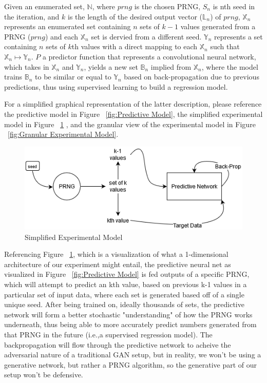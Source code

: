 \documentclass[conference]{IEEEtran}
\begin{document}
Given an enumerated set, $\mathbb{N}$,
where $prng$ is the chosen PRNG, $S_n$ is nth seed in the iteration, and $k$ is the length of the desired output vector ($\mathbb{L}_n$) of $prng$,
$\mathbb{X}_n$ represents an enumerated set containing $n$ sets of $k-1$ values generated from a PRNG ($prng$) and each $\mathbb{X}_n$ set is dervied from a different seed. $\mathbb{Y}_n$ represents a set containing $n$ sets of $k$th values with a direct mapping to each $\mathbb{X}_n$ such that $\mathbb{X}_n \mapsto \mathbb{Y}_n$. $P$ a predictor function that represents a convolutional neural network, which takes in $\mathbb{X}_n$ and $\mathbb{Y}_n$, yields a new set $\mathbb{B}_n$ implied from $\mathbb{X}_n$, where the model trains $\mathbb{B}_n$ to be similar or equal to $\mathbb{Y}_n$ based on back-propagation due to previous predictions, thus using supervised learning to build a regression model.

For a simplified graphical representation of the latter description, please reference the predictive model in Figure ~\ref{fig:Predictive Model}, the simplified experimental model in Figure ~\ref{fig:Simplified Experimental Model} , and the granular view of the experimental model in Figure ~\ref{fig:Granular Experimental Model}.


\begin{figure}[H]
\centering
\includegraphics[width=1\linewidth]{./Images/SimpleModel.png}
\caption{Simplified Experimental Model}
\label{fig:Simplified Experimental Model}
\end{figure}

Referencing Figure ~\ref{fig:Simplified Experimental Model}, which is a visualization of what a 1-dimensional architecture of our experiment might entail, the predictive neural net as visualized in Figure ~\ref{fig:Predictive Model} is fed outputs of a specific PRNG, which will attempt to predict an kth value, based on previous k-1 values in a particular set of input data, where each set is generated based off of a single unique seed. After being trained on, ideally thousands of sets, the predictive network will form a better stochastic "understanding" of how the PRNG works underneath, thus being able to more accurately predict numbers generated from that PRNG in the future (i.e.,a supervised regression model). The backpropagation will flow through the predictive network to acheive the adversarial nature of a traditional GAN setup, but in reality, we won't be using a generative network, but rather a PRNG algorithm, so the generative part of our setup won't be defensive.
\end{document}
